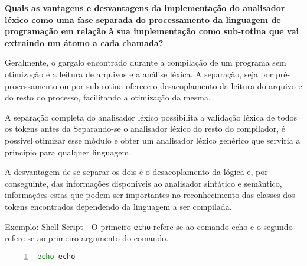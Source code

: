 
\textbf{Quais as vantagens e desvantagens da implementação do analisador léxico como uma fase separada do processamento da linguagem de programação em relação à sua implementação como sub-rotina que vai extraindo um átomo a cada chamada?}

Geralmente, o gargalo encontrado durante a compilação de um programa sem 
otimização é a leitura de arquivos e a análise léxica. A separação, seja por
pré-processamento ou por sub-rotina oferece o desacoplamento da leitura do
arquivo e do resto do processo, facilitando a otimização da mesma.

A separação completa do analisador léxico possibilita a validação léxica de
todos os tokens antes da 
Separando-se o analisador léxico do resto do compilador, é possivel otimizar esse 
módulo e obter um analisador léxico genérico que serviria a princípio 
para qualquer linguagem.

A desvantagem de se separar os dois é o desacoplamento da lógica e, 
por conseguinte, das informações disponíveis ao analisador sintático e 
semântico, informações estas que podem ser importantes no reconhecimento 
das classes dos tokens encontrados dependendo da linguagem a ser compilada.

Exemplo: Shell Script - O primeiro \verb!echo! refere-se ao comando echo e 
o segundo refere-se ao primeiro argumento do comando.

\begin{lstlisting}[frame=single,language=bash,numbers=left]
    echo echo
\end{lstlisting}
